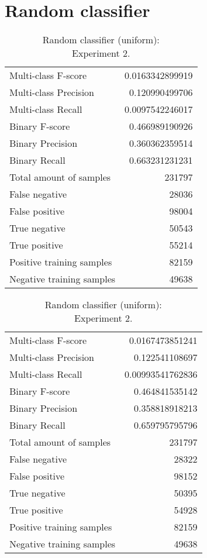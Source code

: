\section{Random classifier}

\begin{table}[H]
\begin{minipage}{0.5\textwidth}
\caption{Random classifier (uniform): \\Experiment 1.}
\centering
\begin{tabular}{l r}
\toprule
Multi-class F-score & 0.0163342899919 \\
Multi-class Precision & 0.120990499706 \\
Multi-class Recall & 0.0097542246017 \\
\midrule
Binary F-score & 0.466989190926 \\
Binary Precision & 0.360362359514 \\
Binary Recall & 0.663231231231 \\
\midrule
Total amount of samples & 231797 \\
False negative & 28036 \\
False positive & 98004 \\
True negative & 50543 \\
True positive & 55214 \\
\midrule
Positive training samples & 82159 \\
Negative training samples & 49638 \\
\bottomrule
\end{tabular}
\end{minipage}
\hfillx
\begin{minipage}{0.5\textwidth}
\caption{Random classifier (uniform): \\Experiment 2.}
\centering
\begin{tabular}{l r}
\toprule
Multi-class F-score & 0.0167473851241 \\
Multi-class Precision & 0.122541108697 \\
Multi-class Recall & 0.00993541762836 \\
\midrule
Binary F-score & 0.464841535142 \\
Binary Precision & 0.358818918213 \\
Binary Recall & 0.659795795796 \\
\midrule
Total amount of samples & 231797 \\
False negative & 28322 \\
False positive & 98152 \\
True negative & 50395 \\
True positive & 54928 \\
\midrule
Positive training samples & 82159 \\
Negative training samples & 49638 \\
\bottomrule
\end{tabular}
\end{minipage}
\end{table}
